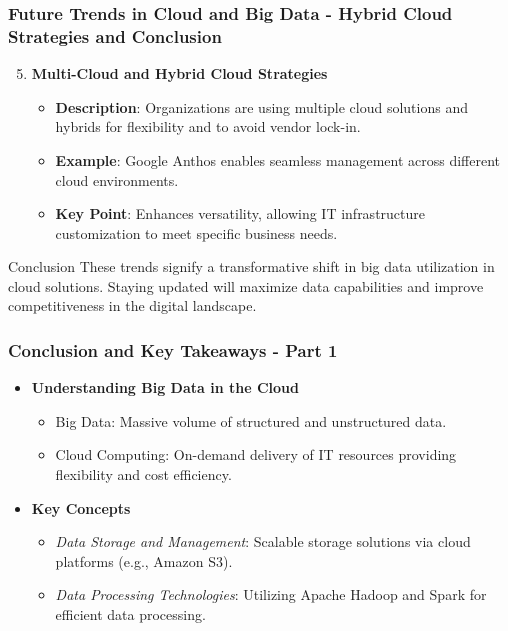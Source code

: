 \documentclass[aspectratio=169]{beamer}
\begin{document}
\begin{frame}[fragile]
    \frametitle{Future Trends in Cloud and Big Data - Hybrid Cloud Strategies and Conclusion}
    \begin{enumerate}
        \setcounter{enumi}{4} %
        \item \textbf{Multi-Cloud and Hybrid Cloud Strategies}
            \begin{itemize}
                \item \textbf{Description}: Organizations are using multiple cloud solutions and hybrids for flexibility and to avoid vendor lock-in.
                \item \textbf{Example}: Google Anthos enables seamless management across different cloud environments.
                \item \textbf{Key Point}: Enhances versatility, allowing IT infrastructure customization to meet specific business needs.
            \end{itemize}
    \end{enumerate}

    \begin{block}{Conclusion}
        These trends signify a transformative shift in big data utilization in cloud solutions. Staying updated will maximize data capabilities and improve competitiveness in the digital landscape.
    \end{block}
\end{frame}

\begin{frame}[fragile]
    \frametitle{Conclusion and Key Takeaways - Part 1}
    \begin{itemize}
        \item \textbf{Understanding Big Data in the Cloud}
            \begin{itemize}
                \item Big Data: Massive volume of structured and unstructured data.
                \item Cloud Computing: On-demand delivery of IT resources providing flexibility and cost efficiency.
            \end{itemize}
        
        \item \textbf{Key Concepts}
            \begin{itemize}
                \item \textit{Data Storage and Management}: Scalable storage solutions via cloud platforms (e.g., Amazon S3).
                \item \textit{Data Processing Technologies}: Utilizing Apache Hadoop and Spark for efficient data processing.
            \end{itemize}
    \end{itemize}
\end{frame}
\end{document}

